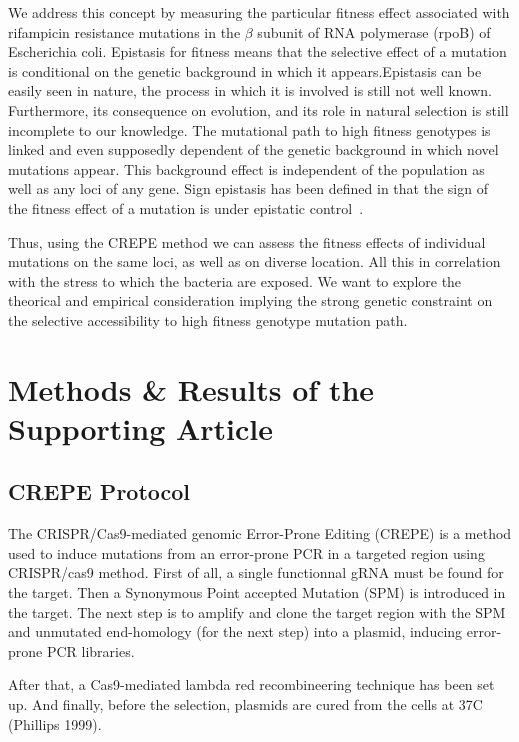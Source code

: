 \documentclass[12pt]{article}
\begin{document}
  We address this concept by measuring the particular fitness effect associated
  with rifampicin resistance mutations in the $\beta$ subunit of RNA polymerase
  (rpoB) of Escherichia coli.  Epistasis for fitness means that the selective
  effect of a mutation is conditional on the genetic background in which it
  appears.Epistasis can be easily seen in nature, the process in which it is
  involved is still not well known. Furthermore, its consequence on evolution,
  and its role in natural selection is still incomplete to our knowledge. The
  mutational path to high fitness genotypes is linked and even supposedly
  dependent of the genetic background in which novel mutations appear. This
  background effect is independent of the population as well as any loci of any
  gene. Sign epistasis has been defined in that the sign of the fitness effect
  of a mutation is under epistatic control~\cite{garst2017genome}. 

  Thus, using the CREPE method we can assess the fitness effects of individual
  mutations on the same loci, as well as on diverse location. All this in
  correlation with the stress to which the bacteria are exposed. We want to
  explore the theorical and empirical consideration implying the strong genetic
  constraint on the selective accessibility to high fitness genotype mutation
  path.

  \section{Methods \& Results of the Supporting Article}

  \subsection{CREPE Protocol}

  The CRISPR/Cas9-mediated genomic Error-Prone Editing (CREPE) is a method used
  to induce mutations from an error-prone PCR in a targeted region using
  CRISPR/cas9 method. First of all, a single functionnal gRNA must be found for
  the target. Then a Synonymous Point accepted Mutation (SPM) is introduced in
  the target. The next step is to amplify and clone the target region with the
  SPM and unmutated end-homology (for the next step) into a plasmid, inducing
  error-prone PCR libraries.

  After that, a Cas9-mediated lambda red recombineering technique has been set
  up. And finally, before the selection, plasmids are cured from the cells at
  37\textdegree C (Phillips 1999).
\end{document}
